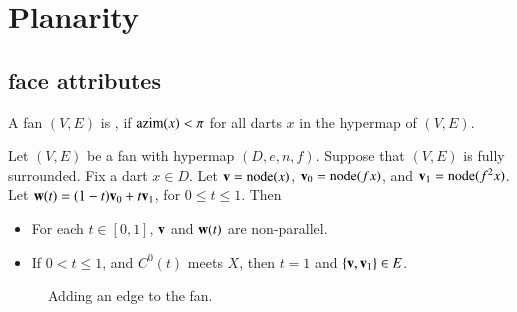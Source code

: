 \section{Planarity}


\subsection{face attributes}

\begin{definition}
A fan $(V,E)$ is , if ${\operatorname{azim}}(x)<\pi$
for all darts $x$ in the hypermap of $(V,E)$.
\end{definition}
%

\begin{lemma}[sweep]\label{lemma:sweep}  
Let $(V,E)$ be a fan with hypermap $(D,e,n,f)$.  
Suppose that $(V,E)$ is fully surrounded. Fix a dart $x\in D$.
Let ${\mathbf v} = {\operatorname{node}}(x)$, ${\mathbf v}_0 = {\operatorname{node}}(f x)$,
and ${\mathbf v}_1 = {\operatorname{node}}(f^2 x)$.  Let ${\mathbf w}(t) = (1-t) {\mathbf v}_0 + t {\mathbf v}_1$, for
$0\le t\le 1$.  Then
\begin{itemize}
\item  For each $t\in[0,1]$, ${\mathbf v}$ and ${\mathbf w}(t)$ are non-parallel.
\item If $0 < t \le 1$, and $C^0(t)$ meets $X$, then $t=1$ and
$\{{\mathbf v},{\mathbf v}_1\}\in E$.
\end{itemize}
\end{lemma}


\begin{figure}[htb]
\centering
{}
\caption{Adding an edge to the fan.}
\label{fig:vt}
\end{figure}


